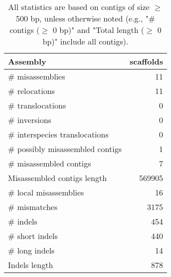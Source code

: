 \documentclass[12pt,a4paper]{article}
\begin{document}
\begin{table}[ht]
\begin{center}
\caption{All statistics are based on contigs of size $\geq$ 500 bp, unless otherwise noted (e.g., "\# contigs ($\geq$ 0 bp)" and "Total length ($\geq$ 0 bp)" include all contigs).}
\begin{tabular}{|l*{1}{|r}|}
\hline
Assembly & scaffolds \\ \hline
\# misassemblies & 11 \\ \hline
\hspace{5mm}\# relocations & 11 \\ \hline
\hspace{5mm}\# translocations & 0 \\ \hline
\hspace{5mm}\# inversions & 0 \\ \hline
\hspace{5mm}\# interspecies translocations & 0 \\ \hline
\# possibly misassembled contigs & 1 \\ \hline
\# misassembled contigs & 7 \\ \hline
Misassembled contigs length & 569905 \\ \hline
\# local misassemblies & 16 \\ \hline
\# mismatches & 3175 \\ \hline
\# indels & 454 \\ \hline
\hspace{5mm}\# short indels & 440 \\ \hline
\hspace{5mm}\# long indels & 14 \\ \hline
Indels length & 878 \\ \hline
\end{tabular}
\end{center}
\end{table}
\end{document}
